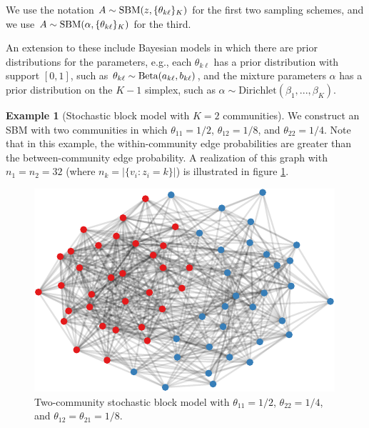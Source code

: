 \documentclass[
  12pt,
]{article}
\theoremstyle{definition}
\theoremstyle{definition}
\newtheorem{example}{Example}[section]
\theoremstyle{definition}
\theoremstyle{definition}
\theoremstyle{remark}
\begin{document}
We use the notation \(A \sim \mathrm{SBM}(z, \{\theta_{k \ell}\}_K)\) for the first two sampling schemes, and we use \(A \sim \mathrm{SBM}(\alpha, \{\theta_{k \ell}\}_K)\) for the third.

An extension to these include Bayesian models in which there are prior distributions for the parameters, e.g., each \(\theta_{k \ell}\) has a prior distribution with support \([0, 1]\), such as \(\theta_{k \ell} \sim \mathrm{Beta}(a_{k \ell}, b_{k \ell})\), and the mixture parameters \(\alpha\) has a prior distribution on the \(K-1\) simplex, such as \(\alpha \sim \mathrm{Dirichlet}(\beta_1, ..., \beta_K)\).

\begin{example}[Stochastic block model with $K = 2$ communities]
\label{ex:assort-sbm}
We construct an SBM with two communities in which $\theta_{11} = 1/2$, $\theta_{12} = 1/8$, and $\theta_{22} = 1/4$. 
Note that in this example, the within-community edge probabilities are greater than the between-community edge probability. 
A realization of this graph with $n_1 = n_2 = 32$ (where $n_k = |\{v_i : z_i = k\}|$) is illustrated in figure \ref{fig:assort-sbm}.

\begin{figure}[H]

{\centering \includegraphics{draft_files/figure-latex/assort-sbm-1} 

}

\caption{Two-community stochastic block model with $\theta_{11}=1/2$, $\theta_{22}=1/4$, and $\theta_{12} = \theta_{21} = 1/8$.}\label{fig:assort-sbm}
\end{figure}
\end{example}
\end{document}
